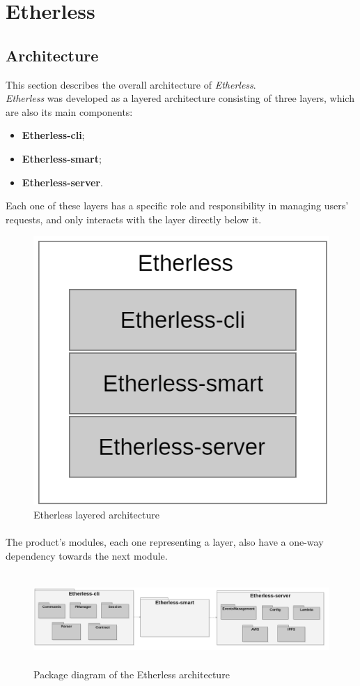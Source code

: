 \section{Etherless}
	\subsection{Architecture} %
	This section describes the overall architecture of \textit{Etherless}. \\
	\textit{Etherless} was developed as a layered architecture consisting of three layers, which are also its main components:
	\begin{itemize}
		\item \textbf{Etherless-cli};
		\item \textbf{Etherless-smart};
		\item \textbf{Etherless-server}.
	\end{itemize}
	Each one of these layers has a specific role and responsibility in managing users' requests, and only interacts with the layer directly below it.
	\begin{figure} [h!]
		\centering
		\includegraphics[width=0.7\linewidth]{diagrammi/generali/LayeredArchitecture}
		\caption{Etherless layered architecture}
	\end{figure}
	\pagebreak
	\paragraph{} The product's modules, each one representing a layer, also have a one-way dependency towards the next module.
	\begin{figure} [h!]
		\centering
		\includegraphics[width=15cm, height=3.5cm]{diagrammi/generali/Etherless_package}
		\caption{Package diagram of the Etherless architecture}
	\end{figure}
